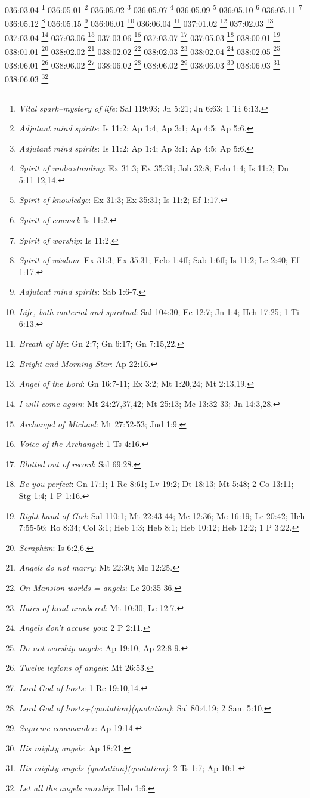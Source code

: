 {036:03.04 \footnote{\textit{Vital spark--mystery of life}: Sal 119:93; Jn 5:21; Jn 6:63; 1 Ti 6:13.}
036:05.01 \footnote{\textit{Adjutant mind spirits}: Is 11:2; Ap 1:4; Ap 3:1; Ap 4:5; Ap 5:6.}
036:05.02 \footnote{\textit{Adjutant mind spirits}: Is 11:2; Ap 1:4; Ap 3:1; Ap 4:5; Ap 5:6.}
036:05.07 \footnote{\textit{Spirit of understanding}: Ex 31:3; Ex 35:31; Job 32:8; Eclo 1:4; Is 11:2; Dn 5:11-12,14.}
036:05.09 \footnote{\textit{Spirit of knowledge}: Ex 31:3; Ex 35:31; Is 11:2; Ef 1:17.}
036:05.10 \footnote{\textit{Spirit of counsel}: Is 11:2.}
036:05.11 \footnote{\textit{Spirit of worship}: Is 11:2.}
036:05.12 \footnote{\textit{Spirit of wisdom}: Ex 31:3; Ex 35:31; Eclo 1:4ff; Sab 1:6ff; Is 11:2; Lc 2:40; Ef 1:17.}
036:05.15 \footnote{\textit{Adjutant mind spirits}: Sab 1:6-7.}
036:06.01 \footnote{\textit{Life, both material and spiritual}: Sal 104:30; Ec 12:7; Jn 1:4; Hch 17:25; 1 Ti 6:13.}
036:06.04 \footnote{\textit{Breath of life}: Gn 2:7; Gn 6:17; Gn 7:15,22.}
037:01.02 \footnote{\textit{Bright and Morning Star}: Ap 22:16.}
037:02.03 \footnote{\textit{Angel of the Lord}: Gn 16:7-11; Ex 3:2; Mt 1:20,24; Mt 2:13,19.}
037:03.04 \footnote{\textit{I will come again}: Mt 24:27,37,42; Mt 25:13; Mc 13:32-33; Jn 14:3,28.}
037:03.06 \footnote{\textit{Archangel of Michael}: Mt 27:52-53; Jud 1:9.}
037:03.06 \footnote{\textit{Voice of the Archangel}: 1 Ts 4:16.}
037:03.07 \footnote{\textit{Blotted out of record}: Sal 69:28.}
037:05.03 \footnote{\textit{Be you perfect}: Gn 17:1; 1 Re 8:61; Lv 19:2; Dt 18:13; Mt 5:48; 2 Co 13:11; Stg 1:4; 1 P 1:16.}
038:00.01 \footnote{\textit{Right hand of God}: Sal 110:1; Mt 22:43-44; Mc 12:36; Mc 16:19; Lc 20:42; Hch 7:55-56; Ro 8:34; Col 3:1; Heb 1:3; Heb 8:1; Heb 10:12; Heb 12:2; 1 P 3:22.}
038:01.01 \footnote{\textit{Seraphim}: Is 6:2,6.}
038:02.02 \footnote{\textit{Angels do not marry}: Mt 22:30; Mc 12:25.}
038:02.02 \footnote{\textit{On Mansion worlds = angels}: Lc 20:35-36.}
038:02.03 \footnote{\textit{Hairs of head numbered}: Mt 10:30; Lc 12:7.}
038:02.04 \footnote{\textit{Angels don't accuse you}: 2 P 2:11.}
038:02.05 \footnote{\textit{Do not worship angels}: Ap 19:10; Ap 22:8-9.}
038:06.01 \footnote{\textit{Twelve legions of angels}: Mt 26:53.}
038:06.02 \footnote{\textit{Lord God of hosts}: 1 Re 19:10,14.}
038:06.02 \footnote{\textit{Lord God of hosts+(quotation)(quotation)}: Sal 80:4,19; 2 Sam 5:10.}
038:06.02 \footnote{\textit{Supreme commander}: Ap 19:14.}
038:06.03 \footnote{\textit{His mighty angels}: Ap 18:21.}
038:06.03 \footnote{\textit{His mighty angels (quotation)(quotation)}: 2 Ts 1:7; Ap 10:1.}
038:06.03 \footnote{\textit{Let all the angels worship}: Heb 1:6.}
}
